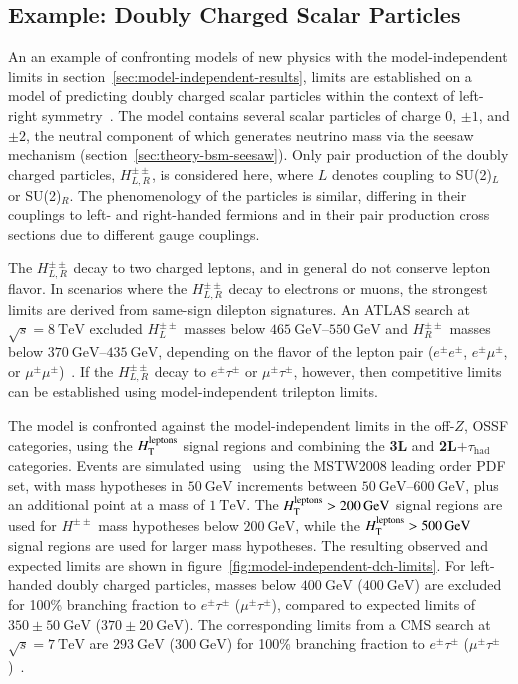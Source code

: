 \subsection{Example: Doubly Charged Scalar Particles}
An an example of confronting models of new physics with the model-independent limits in section~\ref{sec:model-independent-results}, limits are established on a model of predicting doubly charged scalar particles within the context of left-right symmetry~\cite{Pati:1974yy,Mohapatra:1974hk,Senjanovic:1975rk,Rizzo:1981xx}. The model contains several scalar particles of charge 0, $\pm1$, and $\pm2$, the neutral component of which generates neutrino mass via the seesaw mechanism (section~\ref{sec:theory-bsm-seesaw}). Only pair production of the doubly charged particles, $H^{\pm\pm}_{L,R}$, is considered here, where $L$ denotes coupling to SU(2)$_L$ or SU(2)$_R$. The phenomenology of the particles is similar, differing in their couplings to left- and right-handed fermions and in their pair production cross sections due to different gauge couplings. 

The $H^{\pm\pm}_{L,R}$ decay to two charged leptons, and in general do not conserve lepton flavor. In scenarios where the $H^{\pm\pm}_{L,R}$ decay to electrons or muons, the strongest limits are derived from same-sign dilepton signatures. An ATLAS search at $\sqrt{s}=\SI{8}{\tera\electronvolt}$ excluded $H^{\pm\pm}_L$ masses below $\SIrange[range-phrase=-]{465}{550}{\giga\electronvolt}$ and $H^{\pm\pm}_R$ masses below $\SIrange[range-phrase=-]{370}{435}{\giga\electronvolt}$, depending on the flavor of the lepton pair ($e^{\pm}e^{\pm}$, $e^{\pm}\mu^{\pm}$, or $\mu^{\pm}\mu^{\pm}$)~\cite{TheATLASCollaboration:2015gu}. If the $H^{\pm\pm}_{L,R}$ decay to $e^{\pm}\tau^{\pm}$ or $\mu^{\pm}\tau^{\pm}$, however, then competitive limits can be established using model-independent trilepton limits.

The model is confronted against the model-independent limits in the off-$Z$, OSSF categories, using the $H_{\mathrm{T}}^{\mathrm{leptons}}$ signal regions and combining the \textbf{3L} and \textbf{2L$+\tau_{\mathrm{had}}$} categories. Events are simulated using \ using the MSTW2008 leading order PDF set, with mass hypotheses in $\SI{50}{\giga\electronvolt}$ increments between $\SIrange[range-phrase=-]{50}{600}{\giga\electronvolt}$, plus an additional point at a mass of $\SI{1}{\tera\electronvolt}$. The $H_{\mathrm{T}}^{\mathrm{leptons}}>\SI{200}{\giga\electronvolt}$ signal regions are used for $H^{\pm\pm}$ mass hypotheses below $\SI{200}{\giga\electronvolt}$, while the $H_{\mathrm{T}}^{\mathrm{leptons}}>\SI{500}{\giga\electronvolt}$ signal regions are used for larger mass hypotheses. The resulting observed and expected limits are shown in figure~\ref{fig:model-independent-dch-limits}. For left-handed doubly charged particles, masses below $\SI{400}{\giga\electronvolt}$ ($\SI{400}{\giga\electronvolt}$) are excluded for 100\% branching fraction to $e^{\pm}\tau^{\pm}$ ($\mu^{\pm}\tau^{\pm}$), compared to expected limits of $350\pm\SI{50}{\giga\electronvolt}$ ($370\pm\SI{20}{\giga\electronvolt}$). The corresponding limits from a CMS search at $\sqrt{s}=\SI{7}{\tera\electronvolt}$ are $\SI{293}{\giga\electronvolt}$ ($\SI{300}{\giga\electronvolt}$) for 100\% branching fraction to $e^{\pm}\tau^{\pm}$ ($\mu^{\pm}\tau^{\pm}$)~\cite{Chatrchyan:2012ya}. 

